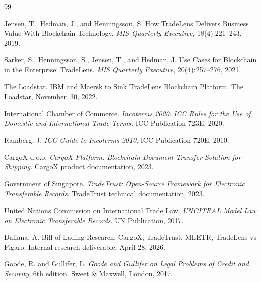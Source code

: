 \documentclass[11pt,a4paper]{article}
\theoremstyle{definition}
\theoremstyle{remark}
\begin{document}
\begin{thebibliography}{99}

Jensen, T., Hedman, J., and Henningsson, S.
\newblock How TradeLens Delivers Business Value With Blockchain
  Technology.
\newblock \emph{MIS Quarterly Executive}, 18(4):221--243, 2019.

Sarker, S., Henningsson, S., Jensen, T., and Hedman, J.
\newblock Use Cases for Blockchain in the Enterprise: TradeLens.
\newblock \emph{MIS Quarterly Executive}, 20(4):257--276, 2021.

The Loadstar.
\newblock IBM and Maersk to Sink TradeLens Blockchain Platform.
\newblock The Loadstar, November~30, 2022.

International Chamber of Commerce.
\newblock \emph{Incoterms 2020: ICC Rules for the Use of Domestic and
  International Trade Terms}.
\newblock ICC Publication 723E, 2020.

Ramberg, J.
\newblock \emph{ICC Guide to Incoterms 2010}.
\newblock ICC Publication 720E, 2010.

CargoX d.o.o.
\newblock \emph{CargoX Platform: Blockchain Document Transfer
  Solution for Shipping}.
\newblock CargoX product documentation, 2023.

Government of Singapore.
\newblock \emph{TradeTrust: Open-Source Framework for Electronic
  Transferable Records}.
\newblock TradeTrust technical documentation, 2023.

United Nations Commission on International Trade Law.
\newblock \emph{UNCITRAL Model Law on Electronic Transferable
  Records}.
\newblock UN Publication, 2017.

Daliana, A.
\newblock Bill of Lading Research: CargoX, TradeTrust, MLETR,
  TradeLens vs Figaro.
\newblock Internal research deliverable, April 28, 2026.

Goode, R. and Gullifer, L.
\newblock \emph{Goode and Gullifer on Legal Problems of Credit and
  Security}, 6th edition.
\newblock Sweet \& Maxwell, London, 2017.

\end{thebibliography}
\end{document}
